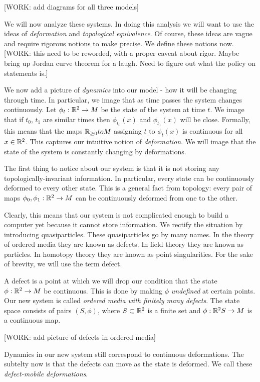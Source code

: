 [WORK: add diagrams for all three models]

We will now analyze these systems. In doing this analysis we will want to use the ideas of \textit{deformation} and \textit{topological equivalence}. Of course, these ideas are vague and require rigorous notions to make precise. We define these notions now. [WORK: this need to be reworded, with a proper caveat about rigor. Maybe bring up Jordan curve theorem for a laugh. Need to figure out what the policy on statements is.]

We now add a picture of \textit{dynamics} into our model - how it will be changing through time. In particular, we image that as time passes the system changes continuously. Let $\phi_t:\mathbb{R}^2\to M$ be the state of the system at time $t$. We image that if $t_0$, $t_1$ are similar times then $\phi_{t_0}(x)$ and $\phi_{t_1}(x)$ will be close. Formally, this means that the maps $\mathbb{R}_{\geq 0}to M$ assigning $t$ to $\phi_t(x)$ is continuous for all $x\in \mathbb{R}^2$. This captures our intuitive notion of \textit{deformation}. We will image that the state of the system is constantly changing by deformations.

The first thing to notice about our system is that it is not storing any topologically-invariant information. In particular, every state can be continuously deformed to every other state. This is a general fact from topology: every pair of maps $\phi_0,\phi_1: \mathbb{R}^2\to M$ can be continuously deformed from one to the other.

Clearly, this means that our system is not complicated enough to build a computer yet because it cannot store information. We rectify the situation by introducing quasiparticles. These quasiparticles go by many names. In the theory of ordered media they are known as defects. In field theory they are known as particles. In homotopy theory they are known as point singularities. For the sake of brevity, we will use the term defect.

A defect is a point at which we will drop our condition that the state $\phi:\mathbb{R}^2\to M$ be continuous. This is done by making $\phi$ \textit{undefined} at certain points. Our new system is called \textit{ordered media with finitely many defects}. The state space consists of pairs $(S,\phi)$, where $S\subset \mathbb{R}^2$ is a finite set and $\phi: \mathbb{R}^2\\ S\to M$ is a continuous map.

[WORK: add picture of defects in ordered media]

Dynamics in our new system still correspond to continuous deformations. The subtelty now is that the defects can move as the state is deformed. We call these \textit{defect-mobile deformations}.

